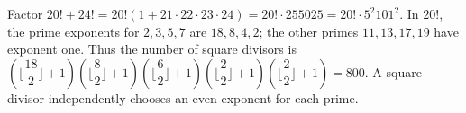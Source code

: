 Factor $20!+24!=20!(1+21\cdot22\cdot23\cdot24)=20!\cdot255025=20!\cdot5^2 101^2$. In $20!$, the prime exponents for $2,3,5,7$ are $18,8,4,2$; the other primes $11,13,17,19$ have exponent one. Thus the number of square divisors is $(\lfloor\dfrac{18}{2}\rfloor+1)(\lfloor\dfrac{8}{2}\rfloor+1)(\lfloor\dfrac{6}{2}\rfloor+1)(\lfloor\dfrac{2}{2}\rfloor+1)(\lfloor\dfrac{2}{2}\rfloor+1)=\boxed{800}$. A square divisor independently chooses an even exponent for each prime.
